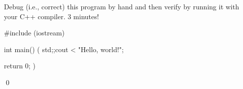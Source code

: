 Debug (i.e., correct) this program by hand 
and then verify by running it 
with your C++ compiler.
3 minutes!
\begin{console}
#include (iostream)

int main()
(
    std;;cout < "Hello, world!\n";

    return 0;
)
\end{console}
\qed
